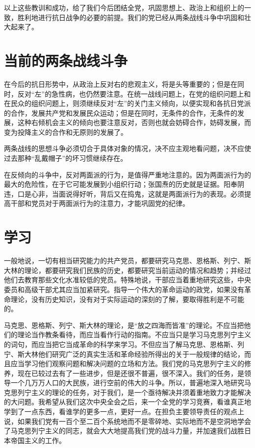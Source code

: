 以上这些教训和成功，给了我们今后团结全党，巩固思想上、政治上和组织上的一致，胜利地进行抗日战争的必要的前提。我们的党已经从两条战线斗争中巩固和壮大起来了。

\section{当前的两条战线斗争}

在今后的抗日形势中，从政治上反对右的悲观主义，将是头等重要的；但是在同时，反对“左”的急性病，也仍然要注意。在统一战线问题上，在党的组织问题上和在民众的组织问题上，则须继续反对“左”的关门主义倾向，以便实现和各抗日党派的合作，发展共产党和发展民众运动；但是在同时，无条件的合作，无条件的发展，这种右倾机会主义的倾向也要注意反对，否则也就会妨碍合作，妨碍发展，而变为投降主义的合作和无原则的发展了。

两条战线的思想斗争必须切合于具体对象的情况，决不应主观地看问题，决不应使过去那种“乱戴帽子”的坏习惯继续存在。

在反倾向的斗争中，反对两面派的行为，是值得严重地注意的。因为两面派行为的最大的危险性，在于它可能发展到小组织行动；张国焘的历史就是证据。阳奉阴违，口是心非，当面说得好听，背后又在捣鬼，这就是两面派行为的表现。必须提高干部和党员对于两面派行为的注意力，才能巩固党的纪律。

\section{学习}

一般地说，一切有相当研究能力的共产党员，都要研究马克思、恩格斯、列宁、斯大林的理论，都要研究我们民族的历史，都要研究当前运动的情况和趋势；并经过他们去教育那些文化水准较低的党员。特殊地说，干部应当着重地研究这些，中央委员和高级干部尤其应当加紧研究。指导一个伟大的革命运动的政党，如果没有革命理论，没有历史知识，没有对于实际运动的深刻的了解，要取得胜利是不可能的。

马克思、恩格斯、列宁、斯大林的理论，是“放之四海而皆准”的理论。不应当把他们的理论当作教条看待，而应当看作行动的指南。不应当只是学习马克思列宁主义的词句，而应当把它当成革命的科学来学习。不但应当了解马克思、恩格斯、列宁、斯大林他们研究广泛的真实生活和革命经验所得出的关于一般规律的结论，而且应当学习他们观察问题和解决问题的立场和方法。我们党的马克思列宁主义的修养，现在已较过去有了一些进步，但是还很不普遍，很不深入。我们的任务，是领导一个几万万人口的大民族，进行空前的伟大的斗争。所以，普遍地深入地研究马克思列宁主义的理论的任务，对于我们，是一个亟待解决并须着重地致力才能解决的大问题。我希望从我们这次中央全会之后，来一个全党的学习竞赛，看谁真正地学到了一点东西，看谁学的更多一点，更好一点。在担负主要领导责任的观点上说，如果我们党有一百个至二百个系统地而不是零碎地、实际地而不是空洞地学会了马克思列宁主义的同志，就会大大地提高我们党的战斗力量，并加速我们战胜日本帝国主义的工作。

